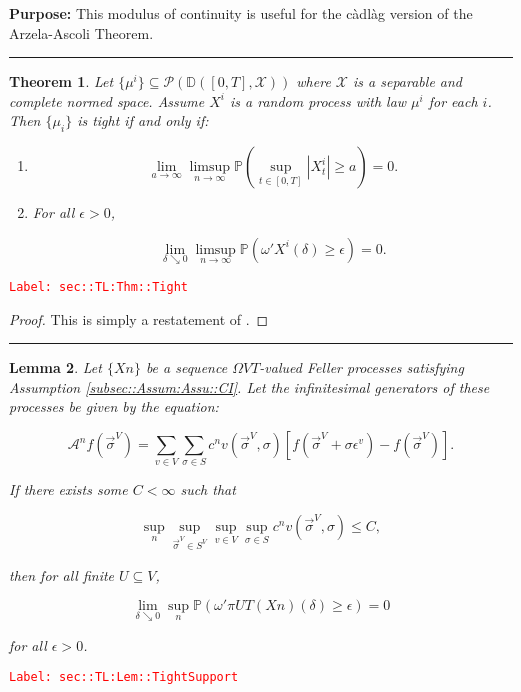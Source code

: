 \documentclass[12pt]{article}
\newcommand{\mb}{\mathbb}
\newcommand{\mc}{\mathcal}
\newcommand{\ra}{\rightarrow}
\newcommand{\ep}{\epsilon}
\newcommand{\tr}{\textcolor{red}}
\newcommand{\labe}[1]{\tr{\texttt{Label: #1}}}
\newcommand{\purpose}{\textbf{Purpose: }}
\newcommand{\lin}{\rule{\linewidth}{0.4 pt}}
\newcommand{\pr}{\mb{P}}							%
\newcommand{\cad}{\mb{D}}							%
\renewcommand{\v}{v}							%
\renewcommand{\U}{U}							%
\renewcommand{\S}{S}							%
\newcommand{\s}{\sigma}							%
\newcommand{\sv}{\vec{\s}}						%
\newcommand{\ev}{\ep}							%
\newcommand{\T}{T}								%
\renewcommand{\t}{t}							%
\newcommand{\proj}{\pi}							%
\newcommand{\X}{X}								%
\newcommand{\IG}{\mc{A}}						%
\newcommand{\IGr}{c}							%
\newcommand{\vind}[1]{^{#1}}					%
\newcommand{\carp}[1]{^{#1}}					%
\newcommand{\vsi}[1]{^{#1}}						%
\newcommand{\cind}[1]{_{#1}}					%
\newcommand{\const}{C}							%
\newcommand{\sln}[1]{^{#1}}						%
\newcommand{\cmodu}{\omega'}					%
\newcommand{\m}{\mu}							%
\newcommand{\spce}{\mc{X}}						%
\newtheorem{thms}{Theorem}[section]
\newtheorem{lem}[thms]{Lemma}
\begin{document}
\purpose This modulus of continuity is useful for the c\`adl\`ag version of the Arzela-Ascoli Theorem.

\lin

\begin{thms}
Let \(\{\m^i\}\subseteq \mc{P}\left(\cad([0,T],\spce)\right)\) where \(\spce\) is a separable and complete normed space. Assume \(\X^i\) is a random process with law \(\m^i\) for each \(i\). Then \(\{\m_i\}\) is tight if and only if:

\begin{enumerate}[(1)]
\item 

\[\lim_{a \ra \infty}\limsup_{n \ra\infty} \pr\left(\sup_{\t \in [0,T]} |\X^i_\t| \geq a\right) = 0.\]

\item For all \(\ep > 0\),

\[\lim_{\delta \searrow 0}\limsup_{n\ra\infty} \pr\left(\cmodu{\X^i}(\delta) \geq \ep\right) = 0.\]
\end{enumerate}
\label{sec::TL:Thm::Tight}
\end{thms}
\labe{sec::TL:Thm::Tight}

\begin{proof}
This is simply a restatement of \cite[Theorem 13.2]{Bil99}.
\end{proof}

\lin

\begin{lem}
Let \(\{\X{}{}{n}\}\) be a sequence \(\Omega{V}{\T}\)-valued Feller processes satisfying Assumption \ref{subsec::Assum:Assu::CI}. Let the infinitesimal generators of these processes be given by the equation:

\[\IG\sln{n}f(\sv\cind{}\vsi{V}) = \sum_{\v\in V}\sum_{\s \in \S} \IGr\sln{n}{\v}(\sv\cind{}\vsi{V},\s)[f(\sv\cind{}\vsi{V} + \s\ev\vind{\v}) - f(\sv\cind{}\vsi{V})].\]

If there exists some \(\const{} < \infty\) such that

\[\sup_{n}\sup_{\sv\cind{}\vsi{V}\in \S\carp{V}}\sup_{\v\in V}\sup_{\s\in \S} \IGr\sln{n}{\v}(\sv\cind{}\vsi{V},\s) \leq \const{},\]

then for all finite \(\U \subseteq V\),

\[\lim_{\delta \searrow 0} \sup_n \pr\left(\cmodu{\proj{\U}{\T}\left(\X{}{}{n}\right)}(\delta) \geq \ep\right) = 0\]

for all \(\ep > 0\).
\label{sec::TL:Lem::TightSupport}
\end{lem}
\labe{sec::TL:Lem::TightSupport}
\end{document}
